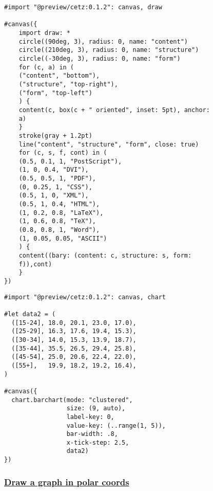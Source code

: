 \pandocbounded{}

\begin{verbatim}
#import "@preview/cetz:0.1.2": canvas, draw

#canvas({
    import draw: *
    circle((90deg, 3), radius: 0, name: "content")
    circle((210deg, 3), radius: 0, name: "structure")
    circle((-30deg, 3), radius: 0, name: "form")
    for (c, a) in (
    ("content", "bottom"),
    ("structure", "top-right"),
    ("form", "top-left")
    ) {
    content(c, box(c + " oriented", inset: 5pt), anchor:
    a)
    }
    stroke(gray + 1.2pt)
    line("content", "structure", "form", close: true)
    for (c, s, f, cont) in (
    (0.5, 0.1, 1, "PostScript"),
    (1, 0, 0.4, "DVI"),
    (0.5, 0.5, 1, "PDF"),
    (0, 0.25, 1, "CSS"),
    (0.5, 1, 0, "XML"),
    (0.5, 1, 0.4, "HTML"),
    (1, 0.2, 0.8, "LaTeX"),
    (1, 0.6, 0.8, "TeX"),
    (0.8, 0.8, 1, "Word"),
    (1, 0.05, 0.05, "ASCII")
    ) {
    content((bary: (content: c, structure: s, form:
    f)),cont)
    }
})
\end{verbatim}

\pandocbounded{}

\begin{verbatim}
#import "@preview/cetz:0.1.2": canvas, chart

#let data2 = (
  ([15-24], 18.0, 20.1, 23.0, 17.0),
  ([25-29], 16.3, 17.6, 19.4, 15.3),
  ([30-34], 14.0, 15.3, 13.9, 18.7),
  ([35-44], 35.5, 26.5, 29.4, 25.8),
  ([45-54], 25.0, 20.6, 22.4, 22.0),
  ([55+],   19.9, 18.2, 19.2, 16.4),
)

#canvas({
  chart.barchart(mode: "clustered",
                 size: (9, auto),
                 label-key: 0,
                 value-key: (..range(1, 5)),
                 bar-width: .8,
                 x-tick-step: 2.5,
                 data2)
})
\end{verbatim}

\pandocbounded{}

\subsubsection{\texorpdfstring{\hyperref[draw-a-graph-in-polar-coords]{Draw
a graph in polar
coords}}{Draw a graph in polar coords}}\label{draw-a-graph-in-polar-coords}

